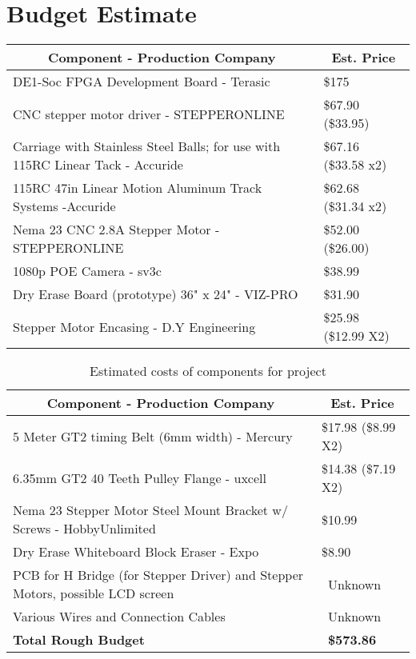 \documentclass[10pt,onecolumn,draftclsnofoot]{IEEEtran} 					%
\begin{document}
	\section{Budget Estimate}
	\setlength{\parindent}{5ex}
		\begin{table} [H]
		\normalsize
		\centering
			\begin{tabular}{|l|l|}
				\hline
				 \multicolumn{1}{|c|}{\textbf{Component - Production Company}}  & \multicolumn{1}{|c|}{\textbf{Est. Price}} \\
				\hline
					DE1-Soc FPGA Development Board - Terasic & \$175 \\
				\hline
					CNC stepper motor driver - STEPPERONLINE & \$67.90 (\$33.95) \\
				\hline
					Carriage with Stainless Steel Balls; for use with 115RC Linear Tack - Accuride & \$67.16 (\$33.58 x2) \\ 
				\hline 		
					115RC 47in Linear Motion Aluminum Track Systems -Accuride & \$62.68 (\$31.34 x2) \\
				\hline
					Nema 23 CNC 2.8A Stepper Motor - STEPPERONLINE & \$52.00 (\$26.00) \\
				\hline
					1080p POE Camera - sv3c & \$38.99 \\
				\hline
					Dry Erase Board (prototype) 36" x 24" - VIZ-PRO & \$31.90 \\
				\hline
					Stepper Motor Encasing - D.Y Engineering & \$25.98 (\$12.99 X2) \\
				\hline
	\end{tabular} 
	\end{table}	

	\setlength{\parindent}{5ex}
\begin{table} [H]	
\normalsize
	\centering
		\begin{tabular}{|l|l|}
			\hline
                \multicolumn{1}{|c|}{\textbf{Component - Production Company}}  & \multicolumn{1}{|c|}{\textbf{Est. Price}} \\
				\hline
					5 Meter GT2 timing Belt (6mm width) - Mercury & \$17.98 (\$8.99 X2) \\
				\hline
					6.35mm GT2 40 Teeth Pulley Flange - uxcell & \$14.38 (\$7.19 X2) \\
				\hline
					Nema 23 Stepper Motor Steel Mount Bracket w/ Screws - HobbyUnlimited & \$10.99 \\
				\hline
					Dry Erase Whiteboard Block Eraser - Expo & \$8.90 \\
				\hline
					PCB for H Bridge (for Stepper Driver) and Stepper Motors, possible LCD screen & \ Unknown \\
				\hline
					Various Wires and Connection Cables & \ Unknown \\
				\hline 
					\textbf{Total Rough Budget} & \ \textbf{\$573.86} \\
				\hline 
		\end{tabular} 
		\caption{Estimated costs of components for project}
		\label{table:1}
	\end{table}	
	
\end{document}
